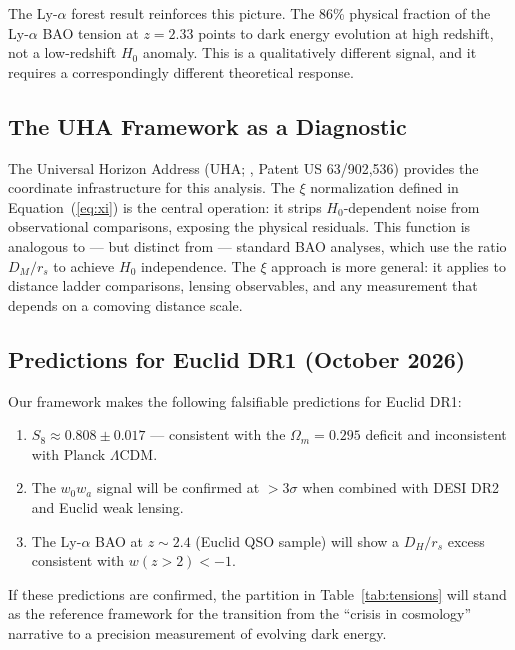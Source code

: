 \documentclass[twocolumn]{aastex631}
\begin{document}
The Ly-$\alpha$ forest result reinforces this picture.
The 86\% physical fraction of the Ly-$\alpha$ BAO tension at $z = 2.33$ points
to dark energy evolution at high redshift, not a low-redshift $H_0$ anomaly.
This is a qualitatively different signal, and it requires a correspondingly
different theoretical response.

\subsection{The UHA Framework as a Diagnostic}

The Universal Horizon Address (UHA; \citealt{Martin2026a}, Patent US 63/902,536)
provides the coordinate infrastructure for this analysis.
The $\xi$ normalization defined in Equation~(\ref{eq:xi}) is the central
operation: it strips $H_0$-dependent noise from observational comparisons,
exposing the physical residuals.
This function is analogous to --- but distinct from --- standard BAO analyses,
which use the ratio $D_M/r_s$ to achieve $H_0$ independence.
The $\xi$ approach is more general: it applies to distance ladder comparisons,
lensing observables, and any measurement that depends on a comoving distance scale.

\subsection{Predictions for Euclid DR1 (October 2026)}

Our framework makes the following falsifiable predictions for Euclid DR1:
\begin{enumerate}
  \item $S_8 \approx 0.808 \pm 0.017$ --- consistent with the $\Omega_m = 0.295$
        deficit and inconsistent with Planck $\Lambda$CDM.
  \item The $w_0 w_a$ signal will be confirmed at $> 3\sigma$ when combined
        with DESI DR2 and Euclid weak lensing.
  \item The Ly-$\alpha$ BAO at $z \sim 2.4$ (Euclid QSO sample) will show
        a $D_H/r_s$ excess consistent with $w(z > 2) < -1$.
\end{enumerate}
If these predictions are confirmed, the partition in Table~\ref{tab:tensions}
will stand as the reference framework for the transition from the
``crisis in cosmology'' narrative to a precision measurement of evolving dark energy.

\end{document}
